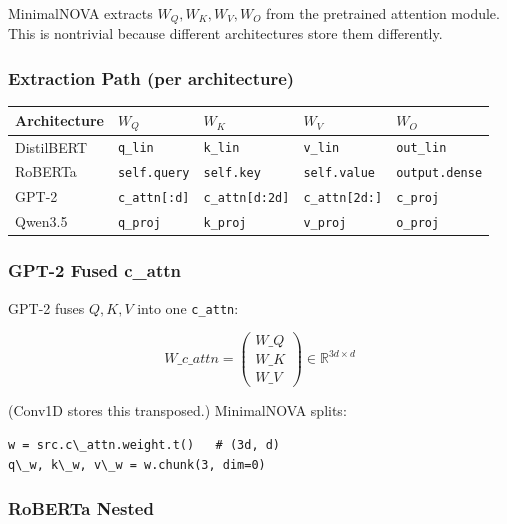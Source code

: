 MinimalNOVA extracts $W_Q, W_K, W_V, W_O$ from the pretrained attention 
module. This is nontrivial because different architectures store them 
differently.

\subsubsection{Extraction Path (per architecture)}

\begin{table}[H]
\centering
\small
\begin{tabular}{lllll}
\toprule
\textbf{Architecture} & \textbf{$W_Q$} & \textbf{$W_K$} & \textbf{$W_V$} & \textbf{$W_O$} \\
\midrule
DistilBERT & \texttt{q\_lin} & \texttt{k\_lin} & \texttt{v\_lin} & \texttt{out\_lin} \\
RoBERTa & \texttt{self.query} & \texttt{self.key} & \texttt{self.value} & \texttt{output.dense} \\
GPT-2 & \texttt{c\_attn[:d]} & \texttt{c\_attn[d:2d]} & \texttt{c\_attn[2d:]} & \texttt{c\_proj} \\
Qwen3.5 & \texttt{q\_proj} & \texttt{k\_proj} & \texttt{v\_proj} & \texttt{o\_proj} \\
\bottomrule
\end{tabular}
\end{table}

\subsubsection{GPT-2 Fused c\_attn}

GPT-2 fuses $Q, K, V$ into one \texttt{c\_attn}:

\[
W\_{c\_attn} = \begin{pmatrix} W\_Q \\ W\_K \\ W\_V \end{pmatrix} \in \mathbb{R}^{3d \times d}
\tag{4.6}
\]

(Conv1D stores this transposed.) MinimalNOVA splits:

\begin{lstlisting}
w = src.c\_attn.weight.t()   # (3d, d)
q\_w, k\_w, v\_w = w.chunk(3, dim=0)
\end{lstlisting}

\subsubsection{RoBERTa Nested}

